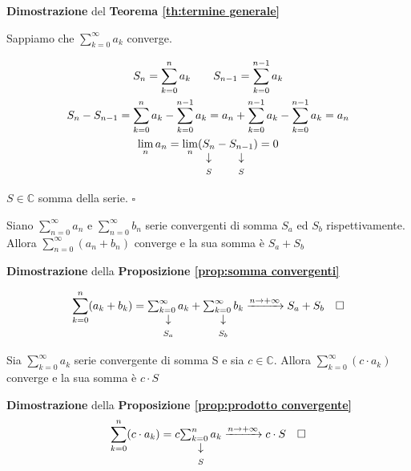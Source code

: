 \begin{dembar}
	\textbf{Dimostrazione} del \textbf{Teorema \ref{th:termine generale}} 
	
	Sappiamo che $\sum_{k=0}^\infty a_k$ converge.
	
	\begin{gather*}
		S_n = \sum_{k=0}^n a_k \qquad S_{n-1} = \sum_{k=0}^{n-1} a_k
		\\
		S_n - S_{n-1} = \sum_{k=0}^n a_k - \sum_{k=0}^{n-1} a_k = a_n + \sum_{k=0}^{n-1} a_k - \sum_{k=0}^{n-1} a_k = a_n
		\\
		\lim_{n} a_n = \lim_{n} (\vertarrowbox{S_n}{$S$} - \vertarrowbox{S_{n-1}}{$S$}) = 0 
	\end{gather*}
	
	$S\in\mathbb{C}$ somma della serie. $\square$
\end{dembar}

\begin{proposition}
	\label{prop:somma convergenti}
	Siano $\sum_{n=0}^\infty a_n$ e $\sum_{n=0}^\infty b_n$ serie convergenti di somma $S_a$ ed $S_b$ rispettivamente. Allora $\sum_{n=0}^\infty (a_n + b_n)$ converge e la sua somma è $S_a+S_b$
\end{proposition}

\begin{dembar}
	\textbf{Dimostrazione} della \textbf{Proposizione \ref{prop:somma convergenti}}
	
	\begin{equation*}
		\sum_{k=0}^n (a_k + b_k) = \vertarrowbox{\sum_{k=0}^\infty a_k}{$S_a$} + \vertarrowbox{\sum_{k=0}^\infty b_k}{$S_b$} \xrightarrow{n\rightarrow+\infty} S_a + S_b \quad \square 
	\end{equation*}
	
\end{dembar}

\begin{proposition}
	\label{prop:prodotto convergente}
	Sia $\sum_{k=0}^\infty a_k$ serie convergente di somma S e sia $c\in\mathbb{C}$. Allora $\sum_{k=0}^\infty (c \cdot a_k)$ converge e la sua somma è $c \cdot S$
\end{proposition}

\begin{dembar}
	\textbf{Dimostrazione} della \textbf{Proposizione \ref{prop:prodotto convergente}}
	\begin{equation*}
		\sum_{k=0}^n (c\cdot a_k) = c\vertarrowbox{\sum_{k=0}^n a_k}{$S$} \xrightarrow{n\rightarrow+\infty} c\cdot S \quad \square
	\end{equation*}

\end{dembar}

